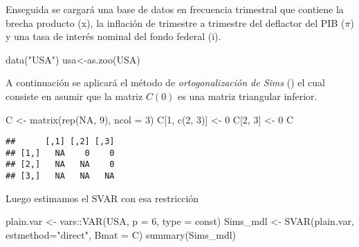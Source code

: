 \documentclass[
]{book}
\newenvironment{Shaded}{\begin{snugshade}}{\end{snugshade}}
\newcommand{\AttributeTok}[1]{\textcolor[rgb]{0.77,0.63,0.00}{#1}}
\newcommand{\ConstantTok}[1]{\textcolor[rgb]{0.00,0.00,0.00}{#1}}
\newcommand{\DecValTok}[1]{\textcolor[rgb]{0.00,0.00,0.81}{#1}}
\newcommand{\FunctionTok}[1]{\textcolor[rgb]{0.00,0.00,0.00}{#1}}
\newcommand{\NormalTok}[1]{#1}
\newcommand{\OtherTok}[1]{\textcolor[rgb]{0.56,0.35,0.01}{#1}}
\newcommand{\SpecialCharTok}[1]{\textcolor[rgb]{0.00,0.00,0.00}{#1}}
\newcommand{\StringTok}[1]{\textcolor[rgb]{0.31,0.60,0.02}{#1}}
\begin{document}
Enseguida se cargará una base de datos en frecuencia trimestral que contiene la brecha producto (x), la inflación de trimestre a trimestre del deflactor del PIB (\(\pi\)) y una tasa de interés nominal del fondo federal (i).

\begin{Shaded}
\begin{Highlighting}[]
\FunctionTok{data}\NormalTok{(}\StringTok{"USA"}\NormalTok{)}
\NormalTok{usa}\OtherTok{\textless{}{-}}\FunctionTok{as.zoo}\NormalTok{(USA)}
\end{Highlighting}
\end{Shaded}

A continuación se aplicará el método de \emph{ortogonalización de Sims} (\citet{Sims80}) el cual consiste en asumir que la matriz \(C(0)\) es una matriz triangular inferior.

\begin{Shaded}
\begin{Highlighting}[]
\NormalTok{C }\OtherTok{\textless{}{-}} \FunctionTok{matrix}\NormalTok{(}\FunctionTok{rep}\NormalTok{(}\ConstantTok{NA}\NormalTok{, }\DecValTok{9}\NormalTok{), }\AttributeTok{ncol =} \DecValTok{3}\NormalTok{)}
\NormalTok{C[}\DecValTok{1}\NormalTok{, }\FunctionTok{c}\NormalTok{(}\DecValTok{2}\NormalTok{, }\DecValTok{3}\NormalTok{)] }\OtherTok{\textless{}{-}} \DecValTok{0}
\NormalTok{C[}\DecValTok{2}\NormalTok{, }\DecValTok{3}\NormalTok{] }\OtherTok{\textless{}{-}} \DecValTok{0}
\NormalTok{C}
\end{Highlighting}
\end{Shaded}

\begin{verbatim}
##      [,1] [,2] [,3]
## [1,]   NA    0    0
## [2,]   NA   NA    0
## [3,]   NA   NA   NA
\end{verbatim}

Luego estimamos el SVAR con esa restricción

\begin{Shaded}
\begin{Highlighting}[]
\NormalTok{plain.var }\OtherTok{\textless{}{-}}\NormalTok{ vars}\SpecialCharTok{::}\FunctionTok{VAR}\NormalTok{(USA, }\AttributeTok{p =} \DecValTok{6}\NormalTok{, }\AttributeTok{type =} \StringTok{\textquotesingle{}const\textquotesingle{}}\NormalTok{)}
\NormalTok{Sims\_mdl  }\OtherTok{\textless{}{-}} \FunctionTok{SVAR}\NormalTok{(plain.var, }\AttributeTok{estmethod=}\StringTok{"direct"}\NormalTok{, }\AttributeTok{Bmat =}\NormalTok{ C)}
\FunctionTok{summary}\NormalTok{(Sims\_mdl)}
\end{Highlighting}
\end{Shaded}
\end{document}
